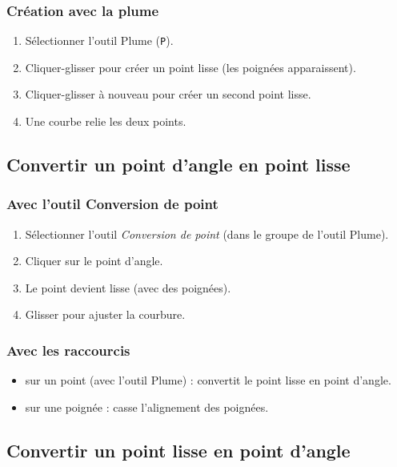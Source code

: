 \subsubsection{Création avec la plume}

\begin{enumerate}
    \item Sélectionner l'outil Plume (\texttt{P}).
    \item Cliquer-glisser pour créer un point lisse (les poignées apparaissent).
    \item Cliquer-glisser à nouveau pour créer un second point lisse.
    \item Une courbe relie les deux points.
\end{enumerate}

\subsection{Convertir un point d'angle en point lisse}

\subsubsection{Avec l'outil Conversion de point}

\begin{enumerate}
    \item Sélectionner l'outil \emph{Conversion de point} (dans le groupe de l'outil Plume).
    \item Cliquer sur le point d'angle.
    \item Le point devient lisse (avec des poignées).
    \item Glisser pour ajuster la courbure.
\end{enumerate}

\subsubsection{Avec les raccourcis}

\begin{itemize}
    \item {} sur un point (avec l'outil Plume) : convertit le point lisse en point d'angle.
    \item {} sur une poignée : casse l'alignement des poignées.
\end{itemize}

\subsection{Convertir un point lisse en point d'angle}

